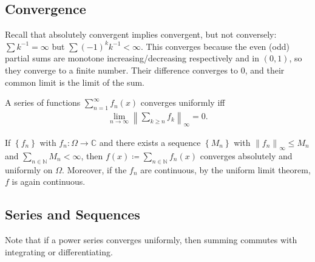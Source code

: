 \hypertarget{convergence}{%
\subsection{Convergence}\label{convergence}}

\begin{remark}

Recall that absolutely convergent implies convergent, but not
conversely: \(\sum k^{-1}= \infty\) but \(\sum (-1)^k k^{-1}< \infty\).
This converges because the even (odd) partial sums are monotone
increasing/decreasing respectively and in \((0, 1)\), so they converge
to a finite number. Their difference converges to 0, and their common
limit is the limit of the sum.

\end{remark}

\begin{proposition}

A series of functions \(\sum_{n=1}^\infty f_n(x)\) converges uniformly
iff
\begin{align*}  
\lim_{n\to \infty} {\left\lVert { \sum_{k\geq n} f_k } \right\rVert}_\infty = 0
.\end{align*}

\end{proposition}

\begin{theorem}

If \(\left\{{f_n}\right\}\) with \(f_n: \Omega \to {\mathbb{C}}\) and
there exists a sequence \(\left\{{M_n}\right\}\) with
\({\left\lVert {f_n} \right\rVert}_\infty \leq M_n\) and
\(\sum_{n\in {\mathbb{N}}} M_n < \infty\), then
\(f(x) \coloneqq\sum_{n\in {\mathbb{N}}} f_n(x)\) converges absolutely
and uniformly on \(\Omega\). Moreover, if the \(f_n\) are continuous, by
the uniform limit theorem, \(f\) is again continuous.

\end{theorem}

\hypertarget{series-and-sequences}{%
\subsection{Series and Sequences}\label{series-and-sequences}}

\begin{remark}

Note that if a power series converges uniformly, then summing commutes
with integrating or differentiating.

\end{remark}

